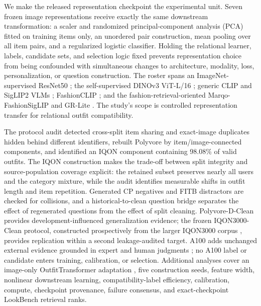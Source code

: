 \documentclass[pdflatex,sn-mathphys-num,iicol]{sn-jnl}
\begin{document}
We make the released representation checkpoint the experimental unit. Seven frozen image representations receive exactly the same downstream transformation: a scaler and randomized principal-component analysis (PCA) fitted on training items only, an unordered pair construction, mean pooling over all item pairs, and a regularized logistic classifier. Holding the relational learner, labels, candidate sets, and selection logic fixed prevents representation choice from being confounded with simultaneous changes to architecture, modality, loss, personalization, or question construction. The roster spans an ImageNet-supervised ResNet50 \cite{deng2009imagenet,he2016resnet}; the self-supervised DINOv3 ViT-L/16 \cite{caron2021dino,oquab2024dinov2,simeoni2025dinov3}; generic CLIP and SigLIP2 VLMs \cite{radford2021clip,zhai2023siglip,tschannen2025siglip2}; FashionCLIP \cite{chia2022fashionclip}; and the fashion-retrieval-oriented Marqo-FashionSigLIP and GR-Lite \cite{zhu2025gcl,marqo2024fashionsiglip,gao2026lookbench}. The study's scope is controlled representation transfer for relational outfit compatibility.

The protocol audit detected cross-split item sharing and exact-image duplicates hidden behind different identifiers, rebuilt Polyvore by item/image-connected components, and identified an IQON component containing 98.08\% of valid outfits. The IQON construction makes the trade-off between split integrity and source-population coverage explicit: the retained subset preserves nearly all users and the category mixture, while the audit identifies measurable shifts in outfit length and item repetition. Generated CP negatives and FITB distractors are checked for collisions, and a historical-to-clean question bridge separates the effect of regenerated questions from the effect of split cleaning. Polyvore-D-Clean provides development-influenced generalization evidence; the frozen IQON3000-Clean protocol, constructed prospectively from the larger IQON3000 corpus \cite{nakamura2018iqon}, provides replication within a second leakage-audited target. A100 adds unchanged external evidence grounded in expert and human judgments \cite{zou2022a100}; no A100 label or candidate enters training, calibration, or selection. Additional analyses cover an image-only OutfitTransformer adaptation \cite{sarkar2023outfittransformer}, five construction seeds, feature width, nonlinear downstream learning, compatibility-label efficiency, calibration, compute, checkpoint provenance, failure consensus, and exact-checkpoint LookBench retrieval ranks.
\end{document}
